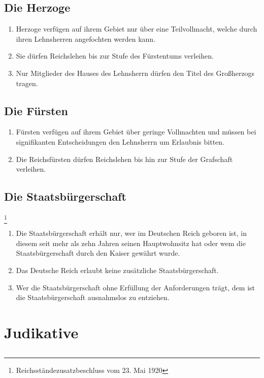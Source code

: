 \documentclass{article}
\begin{document}
\subsection{Die Herzoge}
\begin{enumerate}[(1)]
    \item Herzoge verfügen auf ihrem Gebiet nur über eine Teilvollmacht, welche durch ihren Lehnsherren angefochten werden kann.
    \item Sie dürfen Reichslehen bis zur Stufe des Fürstentums verleihen.
    \item Nur Mitglieder des Hauses des Lehnsherrn dürfen den Titel des Großherzogs tragen.
\end{enumerate}

\subsection{Die Fürsten}
\begin{enumerate}[(1)]
    \item Fürsten verfügen auf ihrem Gebiet über geringe Vollmachten und müssen bei signifikanten Entscheidungen den Lehnsherrn um Erlaubnis bitten.
    \item Die Reichsfürsten dürfen Reichslehen bis hin zur Stufe der Grafschaft verleihen.
\end{enumerate}

\subsection{Die Staatsbürgerschaft}\footnote{Reichsständezusatzbeschluss vom 23. Mai 1920}
\begin{enumerate}[(1)]
    \item Die Staatsbürgerschaft erhält nur, wer im Deutschen Reich geboren ist, in diesem seit mehr als zehn Jahren seinen Hauptwohnsitz hat oder wem die Staatsbürgerschaft durch den Kaiser gewährt wurde.
    \item Das Deutsche Reich erlaubt keine zusätzliche Staatsbürgerschaft.
    \item Wer die Staatsbürgerschaft ohne Erfüllung der Anforderungen trägt, dem ist die Staatsbürgerschaft ausnahmslos zu entziehen.
\end{enumerate}


\section{Judikative}
\subsection{}
\end{document}
